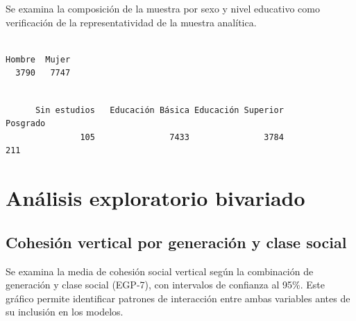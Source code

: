 \documentclass[
  spanish,
  a4paper,
  oneside]{scrbook}
\newenvironment{Shaded}{\begin{snugshade}}{\end{snugshade}}
\newcommand{\FunctionTok}[1]{\textcolor[rgb]{0.28,0.35,0.67}{#1}}
\newcommand{\NormalTok}[1]{\textcolor[rgb]{0.00,0.23,0.31}{#1}}
\newcommand{\SpecialCharTok}[1]{\textcolor[rgb]{0.37,0.37,0.37}{#1}}
\begin{document}
Se examina la composición de la muestra por sexo y nivel educativo como
verificación de la representatividad de la muestra analítica.

\begin{Shaded}
\end{Shaded}

\begin{verbatim}

Hombre  Mujer 
  3790   7747 
\end{verbatim}

\begin{Shaded}
\end{Shaded}

\begin{verbatim}

      Sin estudios   Educación Básica Educación Superior           Posgrado 
               105               7433               3784                211 
\end{verbatim}

\chapter{Análisis exploratorio
bivariado}\label{anuxe1lisis-exploratorio-bivariado}

\section{Cohesión vertical por generación y clase
social}\label{cohesiuxf3n-vertical-por-generaciuxf3n-y-clase-social}

Se examina la media de cohesión social vertical según la combinación de
generación y clase social (EGP-7), con intervalos de confianza al 95\%.
Este gráfico permite identificar patrones de interacción entre ambas
variables antes de su inclusión en los modelos.
\end{document}
